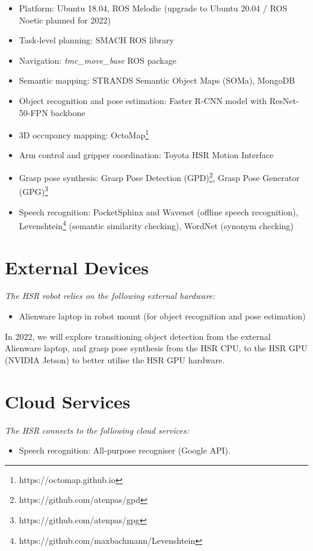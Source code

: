 \begin{itemize}
	\item Platform: Ubuntu 18.04, ROS Melodic (upgrade to Ubuntu 20.04 / ROS Noetic planned for 2022)
	\item Task-level planning: SMACH ROS library
	\item Navigation: \textit{tmc\_move\_base} ROS package
	\item Semantic mapping: STRANDS Semantic Object Maps (SOMa), MongoDB
	\item Object recognition and pose estimation: Faster R-CNN model with ResNet-50-FPN backbone
	\item 3D occupancy mapping: OctoMap\footnote{https://octomap.github.io}
	\item Arm control and gripper coordination: Toyota HSR Motion Interface
	\item Grasp pose synthesis: Grasp Pose Detection  (GPD)\footnote{https://github.com/atenpas/gpd}, Grasp Pose Generator (GPG)\footnote{https://github.com/atenpas/gpg}
	\item Speech recognition: PocketSphinx and Wavenet (offline speech recognition), Levenshtein\footnote{https://github.com/maxbachmann/Levenshtein} (semantic similarity checking), WordNet (synonym checking) 
\end{itemize}

\section*{External Devices}

\textit{The HSR robot relies on the following external hardware:}

\begin{itemize}
	\item Alienware laptop in robot mount (for object recognition and pose estimation)
\end{itemize}

In 2022, we will explore transitioning object detection from the external Alienware laptop, and grasp pose synthesis from the HSR CPU, to the HSR GPU (NVIDIA Jetson) to better utilise the HSR GPU hardware.

\section*{Cloud Services}

\textit{The HSR connects to the following cloud services:}
\begin{itemize}
	\item Speech recognition: All-purpose recogniser (Google API).
\end{itemize}